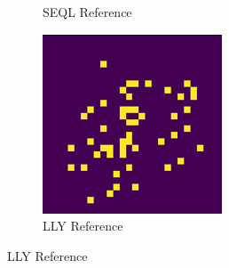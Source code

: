 \documentclass[a4paper,twocolumn]{article} %
\begin{document}
\begin{figure}[h!]
\begin{subfigure}[t]{0.19\linewidth}
        \caption*{SEQL Reference}
    \end{subfigure}
    \hfill
    \begin{subfigure}[t]{0.19\linewidth}
        \includegraphics[width=\linewidth]{figures/reference_features_lly.png}
        \caption*{LLY Reference}
    \end{subfigure}

    \vspace{1em}


\end{figure}
\end{document}

